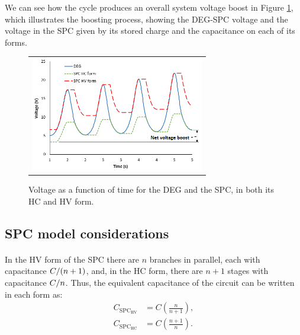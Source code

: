 We can see how the cycle produces an overall system voltage boost in Figure \ref{fig:cycles}, which illustrates the boosting process, showing the DEG-SPC voltage and the voltage in the SPC given by its stored charge and the capacitance on each of its forms. 

\begin{figure}[ht]
\begin{center}
\begin{tabular}{c}
\includegraphics[height=5cm]{fig03/Cycles2.png}\\
\end{tabular}
\end{center}
\caption 
{ \label{fig:cycles}
Voltage as a function of time for the DEG and the SPC, in both its HC and HV form.} 
\end{figure}


\subsection{SPC model considerations}
\paragraph{} In the HV form of the SPC there are $n$ branches in parallel, each with capacitance ${C}/{(n+1)}$, and, in the HC form, there are $n+1$ stages with capacitance ${C}/{n}$. Thus, the equivalent capacitance of the circuit can be written in each form as: \begin{align}
C_{\text{SPC}_\text{HV}}&=C\left(\frac{n}{n+1}\right),\label{eq:cspchv}\\
C_{\text{SPC}_\text{HC}}&=C\left(\frac{n+1}{n}\right).\label{eq:cspchc}
\end{align}

